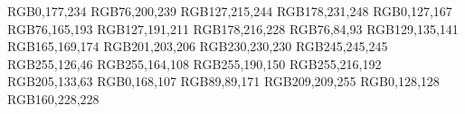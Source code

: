 \usepackage{xcolor}									%
\usepackage{color} 									%

\definecolor{blue1}		{RGB}{0,177,234}				%
\definecolor{blue2}		{RGB}{76,200,239}				%
\definecolor{blue3}		{RGB}{127,215,244}				%
\definecolor{blue4}		{RGB}{178,231,248}				%
\definecolor{bluegray1}	{RGB}{0,127,167}				%
\definecolor{bluegray2}	{RGB}{76,165,193}				%
\definecolor{bluegray3}	{RGB}{127,191,211}				%
\definecolor{bluegray4}	{RGB}{178,216,228}				%
\definecolor{gray1}		{RGB}{76,84,93}				%
\definecolor{gray2}		{RGB}{129,135,141}				%
\definecolor{gray3}		{RGB}{165,169,174}				%
\definecolor{gray4}		{RGB}{201,203,206}				%
\definecolor{gray5}		{RGB}{230,230,230}				%
\definecolor{gray6}		{RGB}{245,245,245}				%
\definecolor{orange1}	{RGB}{255,126,46}				%
\definecolor{orange2}	{RGB}{255,164,108}				%
\definecolor{orange3}	{RGB}{255,190,150}				%
\definecolor{orange4}	{RGB}{255,216,192}				%
\definecolor{brown1}		{RGB}{205,133,63}				%
\definecolor{green1}		{RGB}{0,168,107}				%
\definecolor{purple1}		{RGB}{89,89,171}				%
\definecolor{purple4}		{RGB}{209,209,255}				%
\definecolor{teal1}		{RGB}{0,128,128}				%
\definecolor{teal4}		{RGB}{160,228,228}				%

\def\smallopacity	{0.7}								%
\def\bigopacity		{0.5}								%
\def\verybigopacity	{0.3}								%

\newcommand{\tikzscaleforoneplot}		{1.0}						%
\newcommand{\tikzscalefortwoplots}		{0.8}						%
\newcommand{\tikzscaleforthreeplots}	{0.675}					%
\newcommand{\tikzwidthforoneplot}		{.65\textwidth}				%
\newcommand{\tikzheightforoneplot}		{.4\textwidth}				%
\tikzset{font=\small}											%

